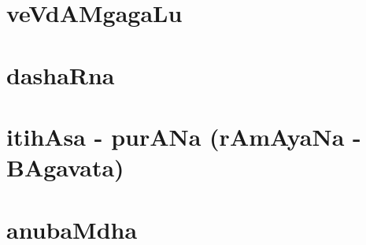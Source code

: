 \documentclass[twoside,openany]{book}
\begin{document}
\fontsize{12}{14}\selectfont

\frontmatter





\newpage


\newpage






\tableofcontents
\newpage

\mainmatter

%

\part*{veVdAMgagaLu}




\part*{dashaRna}




\setcounter{chapter}{5}





\part*{itihAsa - purANa (rAmAyaNa - BAgavata)}






\part*{anubaMdha}


\end{document}
